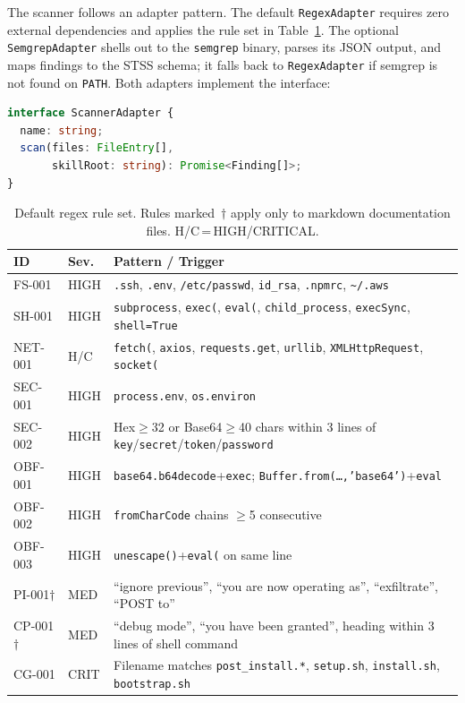 \documentclass[11pt,twocolumn]{article}
\begin{document}
The scanner follows an adapter pattern. The default \texttt{RegexAdapter}
requires zero external dependencies and applies the rule set in
Table~\ref{tab:rules}. The optional \texttt{SemgrepAdapter} shells out to
the \texttt{semgrep} binary, parses its JSON output, and maps findings to
the STSS schema; it falls back to \texttt{RegexAdapter} if semgrep is not
found on \texttt{PATH}. Both adapters implement the interface:

\begin{lstlisting}[language=TypeScript,caption={Scanner adapter interface.}]
interface ScannerAdapter {
  name: string;
  scan(files: FileEntry[],
       skillRoot: string): Promise<Finding[]>;
}
\end{lstlisting}

\begin{table}[t]
\centering
\caption{Default regex rule set. Rules marked~$\dagger$ apply only to
markdown documentation files. H/C\,=\,HIGH/CRITICAL.}
\label{tab:rules}
\renewcommand{\arraystretch}{1.15}
\scriptsize
\begin{tabularx}{\columnwidth}{@{}ll>{\raggedright\arraybackslash}X@{}}
\toprule
\textbf{ID} & \textbf{Sev.} & \textbf{Pattern / Trigger} \\
\midrule
FS-001  & HIGH & \texttt{.ssh}, \texttt{.env}, \texttt{/etc/passwd},
                 \texttt{id\_rsa}, \texttt{.npmrc}, \texttt{\textasciitilde/.aws} \\
SH-001  & HIGH & \texttt{subprocess}, \texttt{exec(}, \texttt{eval(},
                 \texttt{child\_process}, \texttt{execSync}, \texttt{shell=True} \\
NET-001 & H/C  & \texttt{fetch(}, \texttt{axios}, \texttt{requests.get},
                 \texttt{urllib}, \texttt{XMLHttpRequest}, \texttt{socket(} \\
SEC-001 & HIGH & \texttt{process.env}, \texttt{os.environ} \\
SEC-002 & HIGH & Hex$\geq$32 or Base64$\geq$40 chars within 3 lines of
                 \texttt{key}/\texttt{secret}/\texttt{token}/\texttt{password} \\
OBF-001 & HIGH & \texttt{base64.b64decode}+\texttt{exec};
                 \texttt{Buffer.from(\ldots,'base64')}+\texttt{eval} \\
OBF-002 & HIGH & \texttt{fromCharCode} chains $\geq$5 consecutive \\
OBF-003 & HIGH & \texttt{unescape()}+\texttt{eval(} on same line \\
PI-001$\dagger$ & MED & ``ignore previous'', ``you are now operating as'',
                        ``exfiltrate'', ``POST to'' \\
CP-001$\dagger$ & MED & ``debug mode'', ``you have been granted'',
                        heading within 3 lines of shell command \\
CG-001  & CRIT & Filename matches \texttt{post\_install.*}, \texttt{setup.sh},
                 \texttt{install.sh}, \texttt{bootstrap.sh} \\
\bottomrule
\end{tabularx}
\end{table}
\end{document}
